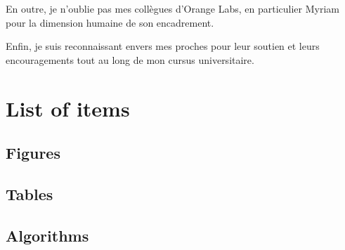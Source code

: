 En outre, je n'oublie pas mes collègues d'Orange Labs, en particulier Myriam pour la dimension humaine de son encadrement.

Enfin, je suis reconnaissant envers mes proches pour leur soutien et leurs encouragements tout au long de mon cursus universitaire.








\pagestyle{empty} %

\tableofcontents %

\begingroup
\makeatletter
\chapter*{List of items}
\section*{Figures}
\let\clearpage\relax
\section*{Tables}
\section*{Algorithms}
\makeatother
\endgroup



\cleardoublepage %

\pagestyle{fancy} %

\clearpage

\printglossary[numberedsection,type=symbols,style=list,nogroupskip]

\printglossary[type=\acronymtype]
\clearpage
